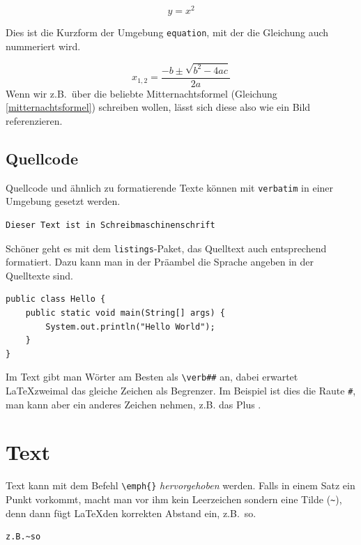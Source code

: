 \[y = x^2 \]

Dies ist die Kurzform der Umgebung \verb|equation|, mit der die Gleichung auch nummeriert wird. 

\begin{equation}
x_{1,2} = \frac{-b\pm\sqrt{b^2-4ac}}{2a}
\label{mitternachtsformel}
\end{equation}
Wenn wir z.B.~über die beliebte Mitternachtsformel (Gleichung \ref{mitternachtsformel}) schreiben wollen, lässt sich diese also wie ein Bild referenzieren.



\subsection{Quellcode}

Quellcode und ähnlich zu formatierende Texte können mit \verb|verbatim| in einer Umgebung gesetzt werden.

\begin{verbatim}
Dieser Text ist in Schreibmaschinenschrift
\end{verbatim}

Schöner geht es mit dem \verb|listings|-Paket, das Quelltext auch entsprechend formatiert. Dazu kann man in der Präambel die Sprache angeben in der Quelltexte sind.

\begin{lstlisting}
public class Hello {
    public static void main(String[] args) {
        System.out.println("Hello World");
    }
}
\end{lstlisting}

Im Text gibt man Wörter am Besten als \verb|\verb##| an, dabei erwartet \LaTeX zweimal das gleiche Zeichen als Begrenzer. Im Beispiel ist dies die Raute \verb|#|, man kann aber ein anderes Zeichen nehmen, z.B. das Plus .



\section{Text}

Text kann mit dem Befehl \verb|\emph{}| \emph{hervorgehoben} werden. Falls in einem Satz ein Punkt vorkommt, macht man vor ihm kein Leerzeichen sondern eine Tilde (\verb|~|), denn dann fügt \LaTeX den korrekten Abstand ein, z.B.~so.

\begin{verbatim}
z.B.~so
\end{verbatim}

